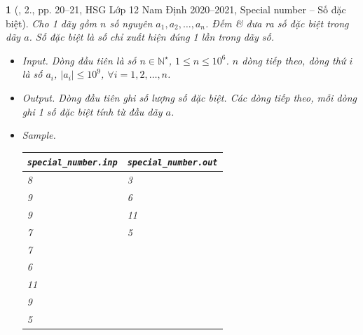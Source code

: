 \documentclass{article}
\newtheorem{baitoan}{}
\begin{document}
\begin{baitoan}[\cite{Trung_HSG_THPT_Tin}, 2., pp. 20--21, HSG Lớp 12 Nam Định 2020--2021, Special number -- Số đặc biệt]
	Cho 1 dãy gồm $n$ số nguyên $a_1,a_2,\ldots,a_n$. Đếm \& đưa ra số đặc biệt trong dãy $a$. {\rm Số đặc biệt} là số chỉ xuất hiện đúng 1 lần trong dãy số.
	\begin{itemize}
		\item {\sf Input.} Dòng đầu tiên là số $n\in\mathbb{N}^\star$, $1\le n\le10^6$. $n$ dòng tiếp theo, dòng thứ $i$ là số $a_i$, $|a_i|\le10^9$, $\forall i = 1,2,\ldots,n$.
		\item {\sf Output.} Dòng đầu tiên ghi số lượng số đặc biệt. Các dòng tiếp theo, mỗi dòng ghi 1 số đặc biệt tính từ đầu dãy $a$.
		\item {\sf Sample.}
		\begin{table}[H]
			\centering
			\begin{tabular}{|l|l|}
				\hline
				\verb|special_number.inp| & \verb|special_number.out| \\
				\hline
				8 & 3 \\
				9 & 6 \\
				9 & 11 \\
				7 & 5 \\
				7 & \\
				6 & \\
				11 & \\
				9 & \\
				5 & \\
				\hline
			\end{tabular}
		\end{table}
	\end{itemize}
\end{baitoan}
\end{document}
